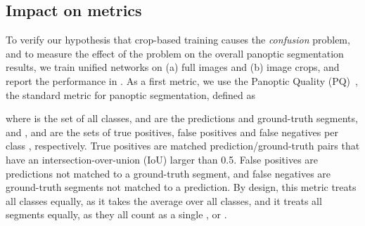 \documentclass[10pt,twocolumn,letterpaper]{article}
\begin{document}
 

\subsection{Impact on metrics}
\label{sec:problem_description:quantification}

To verify our hypothesis that crop-based training causes the \textit{confusion} problem, and to measure the effect of the problem on the overall panoptic segmentation results, we train unified networks on (a) full images and (b) image crops, and report the performance in . As a first metric, we use the Panoptic Quality (PQ)~\cite{kirillov2019ps}, the standard metric for panoptic segmentation, defined as

\noindent

where  is the set of all classes,  and  are the predictions and ground-truth segments, and ,  and  are the sets of true positives, false positives and false negatives per class , respectively. True positives are matched prediction/ground-truth pairs that have an intersection-over-union (IoU) larger than 0.5. False positives are predictions not matched to a ground-truth segment, and false negatives are ground-truth segments not matched to a prediction. By design, this metric treats all classes equally, as it takes the average over all classes, and it treats all segments equally, as they all count as a single ,  or .
\end{document}
